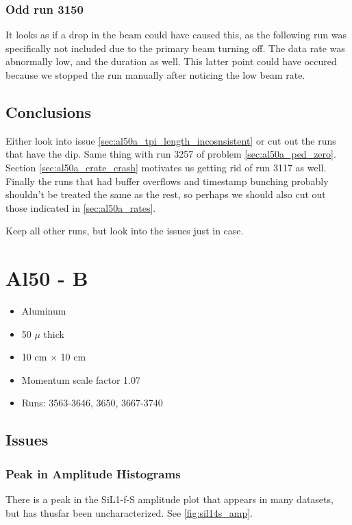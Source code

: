 \documentclass[a4paper]{article}
\begin{document}
\subsubsection{Odd run 3150}
It looks as if a drop in the beam could have caused this, as the following run was specifically not included due
to the primary beam turning off. The data rate was abnormally low, and the duration as well. This latter point
could have occured because we stopped the run manually after noticing the low beam rate.


\subsection{Conclusions}
Either look into issue \ref{sec:al50a_tpi_length_incosnsistent} or cut out the runs that have the dip. Same thing with run 3257 of
problem \ref{sec:al50a_ped_zero}. Section \ref{sec:al50a_crate_crash} motivates us getting rid of run 3117 as well. Finally
the runs that had buffer overflows and timestamp bunching probably shouldn't be treated the same as the rest, so perhaps
we should also cut out those indicated in \ref{sec:al50a_rates}.

Keep all other runs, but look into the issues just in case.



\section{Al50 - B}
\begin{itemize}
  \item Aluminum
  \item 50 $\mu$ thick
  \item 10 cm $\times$ 10 cm
  \item Momentum scale factor 1.07
  \item Runs:
    3563-3646, 3650, 3667-3740
\end{itemize}

\subsection{Issues}
\subsubsection{Peak in Amplitude Histograms}

There is a peak in the SiL1-f-S amplitude plot that appears in many datasets, but has
thusfar been uncharacterized. See \ref{fig:sil14s_amp}.
\end{document}
